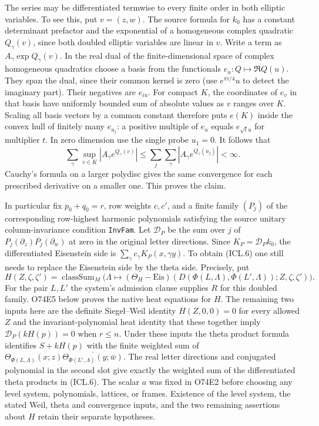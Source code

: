 The series may be differentiated termwise to every finite order in
both elliptic variables. To see this, put $v=(z,w)$. The source
formula for $k_0$ has a constant determinant prefactor and the
exponential of a homogeneous complex quadratic $Q_\gamma(v)$, since
both doubled elliptic variables are linear in $v$. Write a term as
$A_\gamma\exp Q_\gamma(v)$. In the real dual of the finite-dimensional
space of complex homogeneous quadratics choose a basis from the
functionals $e_u:Q\mapsto\Re Q(u)$. They span the dual, since their
common kernel is zero (use $e^{\pi i/4}u$ to detect the imaginary
part). Their negatives are $e_{iu}$. For compact $K$, the coordinates
of $e_v$ in that basis have uniformly bounded sum of absolute values
as $v$ ranges over $K$. Scaling all basis vectors by a common constant
therefore puts $e(K)$ inside the convex hull of finitely many $e_{u_j}$:
a positive multiple of $e_u$ equals $e_{\sqrt{t}u}$ for multiplier $t$.
In zero dimension use the single probe $u_1=0$. It follows that
\[
 \sum_\gamma\sup_{v\in K}|A_\gamma e^{Q_\gamma(v)}|
 \le \sum_j\sum_\gamma |A_\gamma e^{Q_\gamma(u_j)}|<\infty .
\]
Cauchy's formula on a larger polydisc gives the same convergence for
each prescribed derivative on a smaller one. This proves the claim.

In particular fix $p_0+q_0=r$, row weights $c,c'$, and a finite
family $(P_j)$ of the corresponding row-highest harmonic polynomials
satisfying the source unitary column-invariance condition
\texttt{InvFam}. Let $\mathcal D_P$ be the sum over $j$ of
$P_j(\partial_z)\overline{P_j}(\partial_w)$ at zero in the original
letter directions. Since $K_P=\mathcal D_P k_0$, the differentiated
Eisenstein side is $\sum_\gamma c_\gamma K_P(x,\gamma y)$. To obtain
(ICL.6) one still needs to replace the Eisenstein side by the theta
side. Precisely, put
\[
 H(Z,\zeta,\zeta')=\operatorname{classSum}_M
   \bigl(\Lambda\mapsto(\Theta_H-\mathrm{Eis})
       (D(\Phi(L,\Lambda),\Phi(L',\Lambda));Z,\zeta,\zeta')\bigr).
\]
For the pair $L,L'$ the system's admission clause supplies $R$ for
this doubled family. O74E5 below proves the native heat equations for $H$. The
remaining two inputs here are the definite Siegel--Weil identity
$H(Z,0,0)=0$ for every allowed $Z$ and the invariant-polynomial
heat identity that these together imply $\mathcal D_P(kH(p))=0$ when $r\le n$. Under these
inputs the theta product formula identifies $S+kH(p)$ with the finite
weighted sum of
$\Theta_{\Phi(L,\Lambda)}(x;z)\overline{\Theta_{\Phi(L',\Lambda)}(y;\bar w)}$.
The real letter directions and conjugated polynomial in the second
slot give exactly the weighted sum of the differentiated theta
products in (ICL.6). The scalar $a$ was fixed in O74E2 before choosing
any level system, polynomials, lattices, or frames. Existence of the
level system, the stated Weil, theta and convergence inputs, and the
two remaining assertions about $H$ retain their separate hypotheses.

